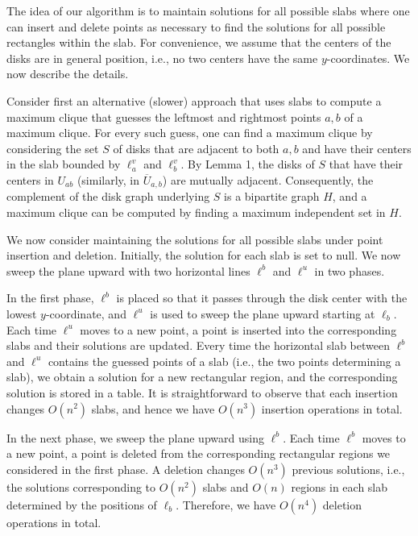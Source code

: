 \documentclass[10pt,a4paper]{amsart}
\begin{document}
\par
\par
The idea of our algorithm is to maintain solutions for all possible slabs where one can insert and delete points as necessary to find the solutions for all possible rectangles within the slab. For convenience, we assume that the centers of the disks are in general position, i.e., no two centers have the same $y$-coordinates. We now describe the details.
\par
\par
Consider first an alternative (slower) approach that uses slabs to compute a maximum clique that guesses the leftmost and rightmost points $a,b$ of a maximum clique. For every such guess, one can find a maximum clique by considering the set $S$ of disks that are adjacent to both $a,b$ and have their centers in the slab bounded by $\ell^{v}_{a}$ and $\ell^{v}_{b}$. By Lemma 1, the disks of $S$ that have their centers in $U_{ab}$ (similarly, in $\overline{U}_{a,b}$) are mutually adjacent. Consequently, the complement of the disk graph underlying $S$ is a bipartite graph $H$, and a maximum clique can be computed by finding a maximum independent set in $H$.
\par
\par
We now consider maintaining the solutions for all possible slabs under point insertion and deletion. Initially, the solution for each slab is set to null. We now sweep the plane upward with two horizontal lines $\ell^{b}$ and $\ell^{u}$ in two phases.
\par
\par
In the first phase, $\ell^{b}$ is placed so that it passes through the disk center with the lowest $y$-coordinate, and $\ell^{u}$ is used to sweep the plane upward starting at $\ell_{b}$. Each time $\ell^{u}$ moves to a new point, a point is inserted into the corresponding slabs and their solutions are updated. Every time the horizontal slab between $\ell^{b}$ and $\ell^{u}$ contains the guessed points of a slab (i.e., the two points determining a slab), we obtain a solution for a new rectangular region, and the corresponding solution is stored in a table. It is straightforward to observe that each insertion changes $O(n^{2})$ slabs, and hence we have $O(n^{3})$ insertion operations in total.
\par
\par
In the next phase, we sweep the plane upward using $\ell^{b}$. Each time $\ell^{b}$ moves to a new point, a point is deleted from the corresponding rectangular regions we considered in the first phase. A deletion changes $O(n^{3})$ previous solutions, i.e., the solutions corresponding to $O(n^{2})$ slabs and $O(n)$ regions in each slab determined by the positions of $\ell_{b}$. Therefore, we have $O(n^{4})$ deletion operations in total.
\end{document}
